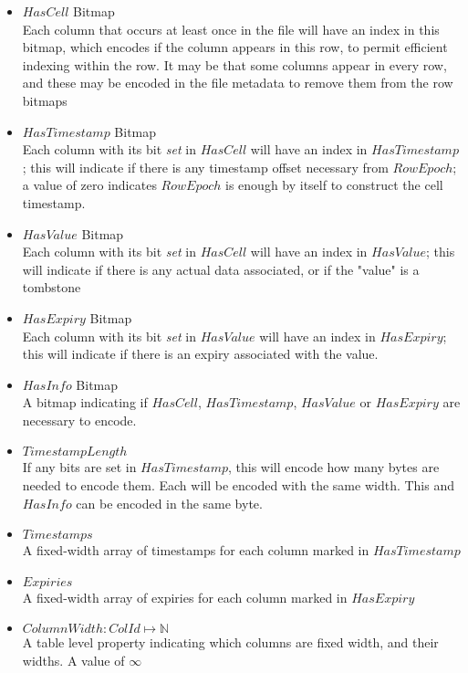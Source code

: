 \documentclass[fleqn]{article}
\begin{document}
\begin{itemize}
\scriptsize
  \item $HasCell$ Bitmap\\[2pt]
    Each column that occurs at least once in the file will have an index in this bitmap, which encodes
    if the column appears in this row, to permit efficient indexing within the row. It may be that some
    columns appear in every row, and these may be encoded in the file metadata to remove them from the
    row bitmaps
  \item $HasTimestamp$ Bitmap\\[2pt]
    Each column with its bit \textit{set} in $HasCell$ will have an index in $HasTimestamp$; this 
    will indicate if there is any timestamp offset necessary from $RowEpoch$; a value of zero 
    indicates $RowEpoch$ is enough by itself to construct the cell timestamp.
  \item $HasValue$ Bitmap\\[2pt]
    Each column with its bit \textit{set} in $HasCell$ will have an index in $HasValue$; this 
    will indicate if there is any actual data associated, or if the "value" is a tombstone
  \item $HasExpiry$ Bitmap\\[2pt]
    Each column with its bit \textit{set} in $HasValue$ will have an index in $HasExpiry$; this 
    will indicate if there is an expiry associated with the value.
  \item $HasInfo$ Bitmap\\[2pt]
    A bitmap indicating if $HasCell$, $HasTimestamp$, $HasValue$ or $HasExpiry$ are necessary to 
    encode.
  \item $TimestampLength$\\[2pt]
    If any bits are set in $HasTimestamp$, this will encode how many bytes are needed to encode them.
    Each will be encoded with the same width. This and $HasInfo$ can be encoded in the same byte.
  \item $Timestamps$\\[2pt]
    A fixed-width array of timestamps for each column marked in $HasTimestamp$
  \item $Expiries$\\[2pt]
    A fixed-width array of expiries for each column marked in $HasExpiry$
  \item $ColumnWidth : ColId \mapsto \mathbb{N}$\\[2pt]
    A table level property indicating which columns are fixed width, and their widths. A value of $\infty$

\end{itemize}
\end{document}
